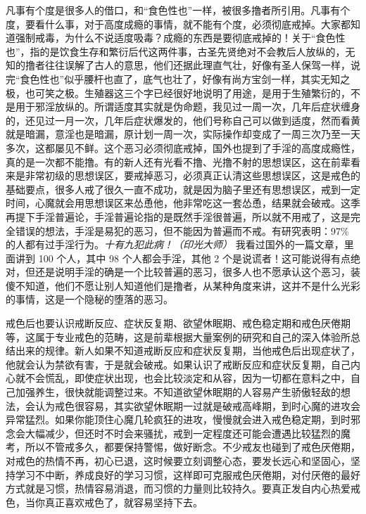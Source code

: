 凡事有个度是很多人的借口，和“食色性也”一样，被很多撸者所引用。凡事有个度，要看什么事，对于高度成瘾的事情，就不能有个度，必须彻底戒掉。大家都知道强制戒毒，为什么不说适度吸毒？成瘾的东西是要彻底戒掉的！关于“食色性也”，指的是饮食生存和繁衍后代这两件事，古圣先贤绝对不会教后人放纵的，无知的撸者往往误解了古人的意思，他们还据此理直气壮，好像有圣人保驾一样，说完“食色性也”似乎腰杆也直了，底气也壮了，好像有尚方宝剑一样，其实无知之极，也可笑之极。生殖器这三个字已经很好地说明了用途，是用于生殖繁衍的，不是用于邪淫放纵的。所谓适度其实就是伪命题，我见过一周一次，几年后症状缠身的，还见过一月一次，几年后症状爆发的，他们号称自己可以做到适度，然而看黄就是暗漏，意淫也是暗漏，原计划一周一次，实际操作却变成了一周三次乃至一天多次，这都屡见不鲜。这个恶习必须彻底戒掉，国外也提到了手淫的高度成瘾性，真的是一次都不能撸。有的新人还有光看不撸、光撸不射的思想误区，这在前辈看来是非常初级的思想误区，要戒掉恶习，必须真正认清这些思想误区，这是戒色的基础要点，很多人戒了很久一直不成功，就是因为脑子里还有思想误区，戒到一定时间，心魔就会用思想误区来怂恿他，他非常吃这一套怂恿，结果就会破戒。这季再提下手淫普遍论，手淫普遍论指的是既然手淫很普遍，所以就不用戒了，这是完全错误的想法，手淫是易犯的恶习，但不能因为普遍而不戒。有研究表明：97\% 的人都有过手淫行为。\textit{十有九犯此病！（印光大师）} 我看过国外的一篇文章，里面讲到 100 个人，其中 98 个人都会手淫，其他 2 个是说谎者！这可能说得有点绝对，但还是说明手淫的确是一个比较普遍的恶习，很多人也不愿承认这个恶习，装傻不知道，他们不愿让别人知道他们是撸者，从某种角度来讲，这并不是什么光彩的事情，这是一个隐秘的堕落的恶习。

戒色后也要认识戒断反应、症状反复期、欲望休眠期、戒色稳定期和戒色厌倦期等，这属于专业戒色的范畴，这是前辈根据大量案例的研究和自己的深入体验所总结出来的规律。新人如果不知道戒断反应和症状反复期，当他戒色后出现症状了，他就会认为禁欲有害，于是就会破戒。如果认识了戒断反应和症状反复期，自己内心就不会慌乱，即使症状出现，也会比较淡定和从容，因为一切都在意料之中，自己加强养生，很快就能调整过来。不知道欲望休眠期的人容易产生骄傲轻敌的想法，会认为戒色很容易，其实欲望休眠期一过就是破戒高峰期，到时心魔的进攻会异常猛烈。如果你能顶住心魔几轮疯狂的进攻，慢慢就会进入戒色稳定期，到时邪念会大幅减少，但还时不时会来骚扰，戒到一定程度还可能会遭遇比较猛烈的魔考，所以不管戒多久，都要保持警惕，做好断念。不少戒友也碰到了戒色厌倦期，对戒色的热情不再，初心已退，这时候要立刻调整心态，要发长远心和坚固心，坚持学习不中断，养成良好的学习习惯，这样即可克服戒色厌倦期，对付厌倦的最好方式就是习惯，热情容易消退，而习惯的力量则比较持久。要真正发自内心热爱戒色，当你真正喜欢戒色了，就容易坚持下去。

